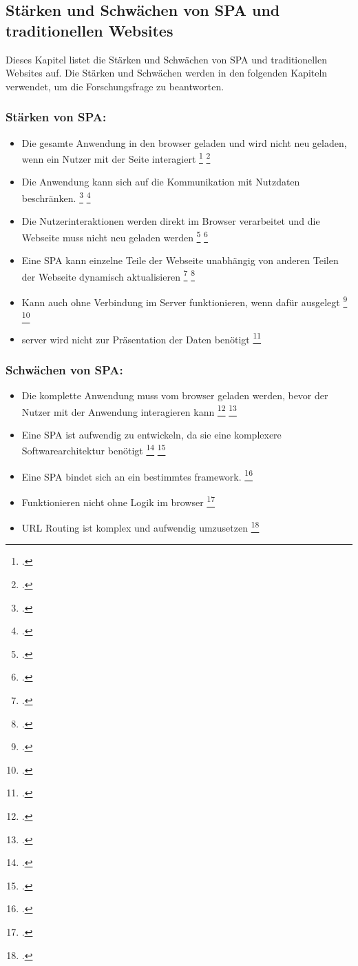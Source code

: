 \subsection{Stärken und Schwächen von \ac{SPA} und traditionellen Websites}
Dieses Kapitel listet die Stärken und Schwächen von \ac{SPA} und traditionellen Websites auf.
Die Stärken und Schwächen werden in den folgenden Kapiteln verwendet, um die Forschungsfrage zu beantworten.

\subsubsection*{Stärken von \ac{SPA}:}
\begin{itemize}
    \item Die gesamte Anwendung in den \gls{browser} geladen und wird nicht neu geladen, wenn ein Nutzer mit der Seite interagiert \footcite[Vgl. ][Seite 3]{Smith2022} \footcite[Vgl.][Seite 7]{Flanagan2011}
    \item Die Anwendung kann sich auf die Kommunikation mit Nutzdaten beschränken. \footcite[Vgl. ][Seite 3]{Smith2022} \footcite[Vgl.][Seite 13]{Flanagan2011}
    \item Die Nutzerinteraktionen werden direkt im Browser verarbeitet und die Webseite muss nicht neu geladen werden \footcite[Vgl. ][Seite 3]{Smith2022} \footcite[Vgl.][Seite 12]{Flanagan2011}
    \item Eine \ac{SPA} kann einzelne Teile der Webseite unabhängig von anderen Teilen der Webseite dynamisch aktualisieren \footcite[Vgl. ][Seite 7]{Smith2022} \footcite[Vgl.][Seite 143]{Irudayaraj2019}
    \item Kann auch ohne Verbindung im Server funktionieren, wenn dafür ausgelegt \footcite[Vgl. ][Seite 7]{Smith2022} \footcite[Vgl.][Seite 235]{Gavrila2019}
    \item \gls{server} wird nicht zur Präsentation der Daten benötigt \footcite[Vgl. ][Seite 7]{Flanagan2011}
\end{itemize}


\subsubsection*{Schwächen von \ac{SPA}:}

\begin{itemize}
    \item Die komplette Anwendung muss vom \gls{browser} geladen werden, bevor der Nutzer mit der Anwendung interagieren kann \footcite[Vgl. ][Seite 3]{Smith2022} \footcite[Vgl.][Seite 235]{Gavrila2019}
    \item Eine \ac{SPA} ist aufwendig zu entwickeln, da sie eine komplexere Softwarearchitektur benötigt \footcite[Vgl. ][Seite 4]{Smith2022} \footcite[Vgl.][Seite 15]{Flanagan2011}
    \item Eine \ac{SPA} bindet sich an ein bestimmtes \gls{framework}. \footcite[Vgl. ][Seite 4]{Smith2022}
    \item Funktionieren nicht ohne Logik im \gls{browser} \footcite[Vgl. ][Seite 7]{Smith2022}
    \item \ac{URL} Routing ist komplex und aufwendig umzusetzen \footcite[Vgl. ][Seite 7]{Smith2022}
\end{itemize}

